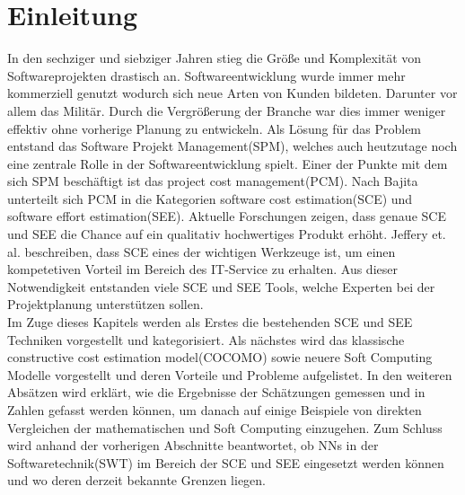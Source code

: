 \section{Einleitung}
In den sechziger und siebziger Jahren stieg die Größe und Komplexität von Softwareprojekten drastisch an. Softwareentwicklung wurde immer mehr kommerziell genutzt wodurch sich neue Arten von Kunden bildeten. Darunter vor allem das Militär. Durch die Vergrößerung der Branche war dies immer weniger effektiv ohne vorherige Planung zu entwickeln. Als Lösung für das Problem entstand das Software Projekt Management(SPM), welches auch heutzutage noch eine zentrale Rolle in der Softwareentwicklung spielt.\cite{Bajta2018} Einer der Punkte mit dem sich SPM beschäftigt ist das project cost management(PCM). Nach Bajita\cite{Bajta2018} unterteilt sich PCM in die Kategorien software cost estimation(SCE) und software effort estimation(SEE). Aktuelle Forschungen zeigen, dass genaue SCE und SEE die Chance auf ein qualitativ hochwertiges Produkt erhöht.\cite{Matson1994}\cite{Bilgaiyan2016} Jeffery et. al. beschreiben, dass SCE eines der wichtigen Werkzeuge ist, um einen kompetetiven Vorteil im Bereich des IT-Service zu erhalten.\cite{Jeffery1990} Aus dieser Notwendigkeit entstanden viele SCE und SEE Tools, welche Experten bei der Projektplanung unterstützen sollen.
\\
Im Zuge dieses Kapitels werden als Erstes die bestehenden SCE und SEE Techniken vorgestellt und kategorisiert. Als nächstes wird das klassische constructive cost estimation model(COCOMO) sowie neuere Soft Computing Modelle vorgestellt und deren Vorteile und Probleme aufgelistet. In den weiteren Absätzen wird erklärt, wie die Ergebnisse der Schätzungen gemessen und in Zahlen  gefasst werden können, um danach auf einige Beispiele von direkten Vergleichen der mathematischen und Soft Computing einzugehen. Zum Schluss wird anhand der vorherigen Abschnitte beantwortet, ob NNs in der Softwaretechnik(SWT) im Bereich der SCE und SEE eingesetzt werden können und wo deren derzeit bekannte Grenzen liegen.

